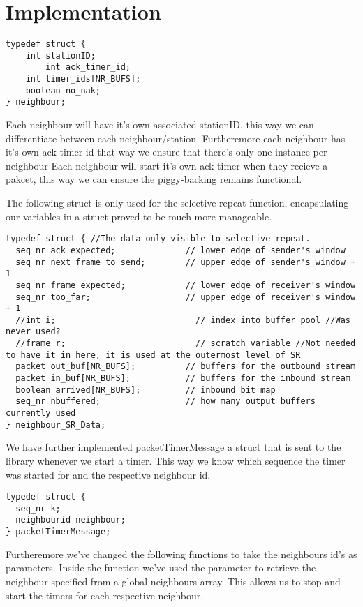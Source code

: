 \section{Implementation}



\begin{lstlisting}
typedef struct {
    int stationID;
		int ack_timer_id;
    int timer_ids[NR_BUFS];
    boolean no_nak;
} neighbour;
\end{lstlisting}

Each neighbour will have it's own associated stationID,
this way we can differentiate between each neighbour/station.
Furtheremore each neighbour has it's own ack-timer-id that way we ensure that there's only one instance per neighbour
Each neighbour will start it's own ack timer when they recieve a pakcet,
this way we can ensure the piggy-backing remains functional.


The following struct is only used for the selective-repeat function,
encapsulating our variables in a struct proved to be much more manageable.

\begin{lstlisting}
typedef struct { //The data only visible to selective repeat.
  seq_nr ack_expected;              // lower edge of sender's window
  seq_nr next_frame_to_send;        // upper edge of sender's window + 1
  seq_nr frame_expected;            // lower edge of receiver's window
  seq_nr too_far;                   // upper edge of receiver's window + 1
  //int i;                            // index into buffer pool //Was never used?
  //frame r;                          // scratch variable //Not needed to have it in here, it is used at the outermost level of SR
  packet out_buf[NR_BUFS];          // buffers for the outbound stream
  packet in_buf[NR_BUFS];           // buffers for the inbound stream
  boolean arrived[NR_BUFS];         // inbound bit map
  seq_nr nbuffered;                 // how many output buffers currently used
} neighbour_SR_Data;
\end{lstlisting}

We have further implemented packetTimerMessage a struct that is sent to the library whenever we start a timer.
This way we know which sequence the timer was started for and the respective neighbour id.
\begin{lstlisting}
typedef struct {
  seq_nr k;
  neighbourid neighbour;
} packetTimerMessage;
\end{lstlisting}


Furtheremore we've changed the following functions to take the neighbours id's as parameters.
Inside the function we've used the parameter to retrieve the neighbour specified from a global neighbours array.
This allows us to stop and start the timers for each respective neighbour.

